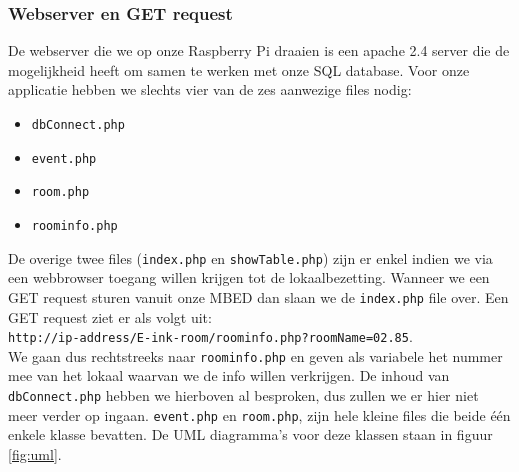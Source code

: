\documentclass[a4paper,kul]{kulakarticle} %
\begin{document}
\subsubsection{Webserver en GET request}
De webserver die we op onze Raspberry Pi draaien is een apache 2.4 server die de mogelijkheid heeft om samen te werken met onze SQL database. Voor onze applicatie hebben we slechts vier van de zes aanwezige files nodig: 
\begin{itemize}
	\item \verb|dbConnect.php|
	\item \verb|event.php|
	\item \verb|room.php|
	\item \verb|roominfo.php|
\end{itemize}
De overige twee files (\verb|index.php| en \verb|showTable.php|) zijn er enkel indien we via een webbrowser toegang willen krijgen tot de lokaalbezetting. Wanneer we een GET request sturen vanuit onze MBED dan slaan we de \verb|index.php| file over. Een GET request ziet er als volgt uit: \\ \verb|http://ip-address/E-ink-room/roominfo.php?roomName=02.85|. \\ We gaan dus rechtstreeks naar \verb|roominfo.php| en geven als variabele het nummer mee van het lokaal waarvan we de info willen verkrijgen.  De inhoud van \verb|dbConnect.php| hebben we hierboven al besproken, dus zullen we er hier niet meer verder op ingaan. \verb|event.php| en \verb|room.php|, zijn hele kleine files die beide \'{e}\'{e}n enkele klasse bevatten. De UML diagramma's voor deze klassen staan in figuur \ref{fig:uml}.
\end{document}
